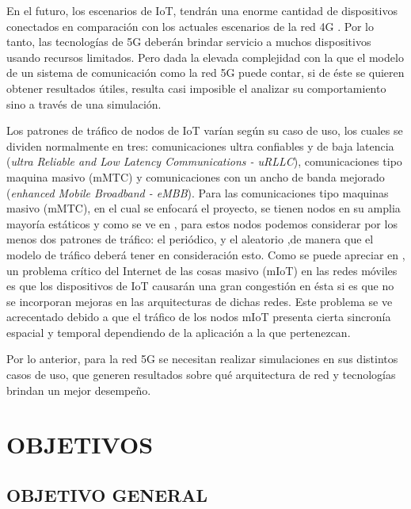 En el futuro, los escenarios de IoT, tendrán una enorme cantidad de dispositivos conectados en comparación con los actuales escenarios de la red 4G \parencite{Whatis5G}. Por lo tanto, las tecnologías de 5G deberán brindar servicio a muchos dispositivos usando recursos limitados. Pero dada la elevada complejidad con la que el modelo de un sistema de comunicación como la red 5G puede contar, si de éste se quieren obtener resultados útiles, resulta casi imposible el analizar su comportamiento sino a través de una simulación.\newline

Los patrones de tráfico de nodos de IoT varían según su caso de uso, los cuales se dividen normalmente en tres: comunicaciones ultra confiables y de baja latencia (\textit{ultra Reliable and Low Latency Communications - uRLLC}), comunicaciones tipo maquina masivo (mMTC) y comunicaciones con un ancho de banda mejorado (\textit{enhanced Mobile Broadband - eMBB}). Para las comunicaciones tipo maquinas masivo (mMTC), en el cual se enfocará el proyecto, se tienen nodos en su amplia mayoría estáticos y como se ve en \parencite{IoTTrafficHossfeld}, para estos nodos podemos considerar por los menos dos patrones de tráfico: el periódico, y el aleatorio ,de manera que el modelo de tráfico deberá tener en consideración esto. Como se puede apreciar en \parencite{IoTTrafficHossfeld}, un problema crítico del Internet de las cosas masivo (mIoT) en las redes móviles es que los dispositivos de IoT causarán una gran congestión en ésta si es que no se incorporan mejoras en las arquitecturas de dichas redes. Este problema se ve acrecentado debido a que el tráfico de los nodos mIoT presenta cierta sincronía espacial y temporal dependiendo de la aplicación a la que pertenezcan.\newline

Por lo anterior, para la red 5G se necesitan realizar simulaciones en sus distintos casos de uso, que generen resultados sobre qué arquitectura de red y tecnologías brindan un mejor desempeño.\newline


\section{OBJETIVOS}
\subsection{OBJETIVO GENERAL}

